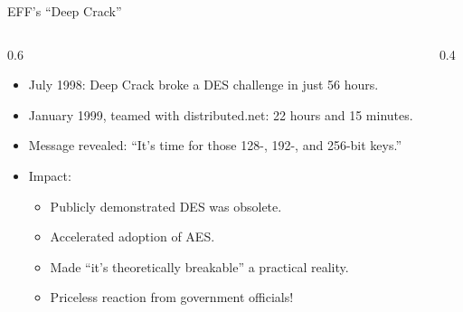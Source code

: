 \ifdefined\PRESENTATION\else\PassOptionsToClass{handout}{beamer}\fi\documentclass[aspectratio=169, lualatex]{beamer}
\begin{document}
\begin{frame}{EFF's ``Deep Crack''}
	\begin{columns}[c]
		\begin{column}{0.6\textwidth}
			\begin{itemize}
				\item July 1998: Deep Crack broke a DES challenge in just 56 hours.
				\item January 1999, teamed with distributed.net: 22 hours and 15 minutes.
				\item Message revealed: ``It's time for those 128-, 192-, and 256-bit keys.''
				\item Impact:
				      \begin{itemize}
					      \item Publicly demonstrated DES was obsolete.
					      \item Accelerated adoption of AES.
					      \item Made ``it's theoretically breakable'' a practical reality.
					      \item Priceless reaction from government officials!
				      \end{itemize}
			\end{itemize}
		\end{column}
		\begin{column}{0.4\textwidth}
		\end{column}
	\end{columns}
\end{frame}
\end{document}
